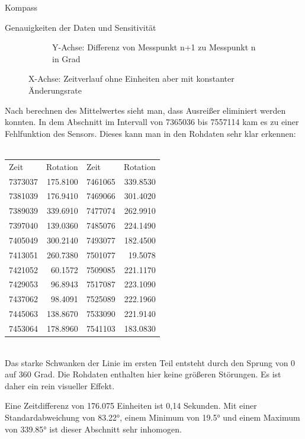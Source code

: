 \documentclass[12pt]{report}
\begin{document}
\begin{section}{Kompass}
\begin{subsection}{Genauigkeiten der Daten und Sensitivität}
\begin{figure}[H]
\begin{subfigure}{0.45\linewidth}
      \caption{Y-Achse: Differenz von Messpunkt n+1 zu Messpunkt n in Grad}
    \end{subfigure}
    \caption{X-Achse: Zeitverlauf ohne Einheiten aber mit konstanter Änderungsrate}
  \end{figure}

  Nach berechnen des Mittelwertes sieht man, dass Ausreißer eliminiert werden
  konnten. In dem Abschnitt im Intervall von 7365036 bis 7557114 kam es zu
  einer Fehlfunktion des Sensors. Dieses kann man in den Rohdaten sehr klar
  erkennen:\\
  \\
  \begin{tabular}{lr|lr}
    \centering
    Zeit    &  Rotation & Zeit    &  Rotation \\
    7373037 &  175.8100 & 7461065 &  339.8530 \\
    7381039 &  176.9410 & 7469066 &  301.4020 \\
    7389039 &  339.6910 & 7477074 &  262.9910 \\
    7397040 &  139.0360 & 7485076 &  224.1490 \\
    7405049 &  300.2140 & 7493077 &  182.4500 \\
    7413051 &  260.7380 & 7501077 &   19.5078 \\
    7421052 &   60.1572 & 7509085 &  221.1170 \\
    7429053 &   96.8943 & 7517087 &  223.1090 \\
    7437062 &   98.4091 & 7525089 &  222.1960 \\
    7445063 &  138.8670 & 7533090 &  221.9140 \\
    7453064 &  178.8960 & 7541103 &  183.0830 \\
  \end{tabular}
  \\

  Das starke Schwanken der Linie im ersten Teil entsteht durch den Sprung
  von 0 auf 360 Grad. Die Rohdaten enthalten hier keine größeren Störungen. Es
  ist daher ein rein visueller Effekt.

  Eine Zeitdifferenz von 176.075 Einheiten ist 0,14 Sekunden.
  Mit einer Standardabweichung von 83.22\si{\degree}, einem Minimum von 19.5\si{\degree} und
  einem Maximum von 339.85\si{\degree} ist dieser Abschnitt sehr inhomogen.


\end{subsection}
\end{section}
\end{document}
